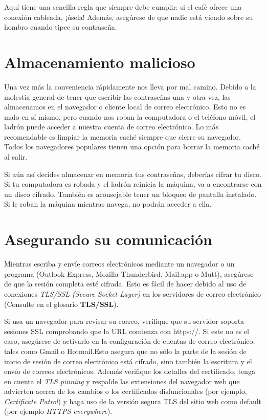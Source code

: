 \documentclass[10pt,a5paper,twoside,,]{book}
\begin{document}
Aquí tiene una sencilla regla que siempre debe cumplir: si el café
ofrece una conexión cableada, ¡úsela! Además, asegúrese de que nadie
está viendo sobre su hombro cuando tipee su contraseña.

\section{Almacenamiento malicioso}\label{almacenamiento-malicioso}

Una vez más la conveniencia rápidamente nos lleva por mal camino. Debido
a la molestia general de tener que escribir las contraseñas una y otra
vez, las almacenamos en el navegador o cliente local de correo
electrónico. Esto no es malo en sí mismo, pero cuando nos roban la
computadora o el teléfono móvil, el ladrón puede acceder a nuestra
cuenta de correo electrónico. Lo más recomendable es limpiar la memoria
caché siempre que cierre su navegador. Todos los navegadores populares
tienen una opción para borrar la memoria caché al salir.

Si aún así decides almacenar en memoria tus contraseñas, deberías cifrar
tu disco. Si tu computadora es robada y el ladrón reinicia la máquina,
va a encontrarse con un disco cifrado. También es aconsejable tener un
bloqueo de pantalla instalado. Si le roban la máquina mientras navega,
no podrán acceder a ella.

\section{Asegurando su
comunicación}\label{asegurando-su-comunicaciuxf3n}

Mientras escriba y envíe correos electrónicos mediante un navegador o un
programa (Outlook Express, Mozilla Thunderbird, Mail.app o Mutt),
asegúrese de que la sesión completa esté cifrada. Esto es fácil de hacer
debido al uso de conexiones \emph{TLS/SSL (Secure Socket Layer)} en los
servidores de correo electrónico (Consulte en el glosario
\textbf{TLS/SSL}).

Si usa un navegador para revisar su correo, verifique que su servidor
soporta sesiones SSL comprobando que la URL comienza con https://. Si
este no es el caso, asegúrese de activarlo en la configuración de
cuentas de correo electrónico, tales como Gmail o Hotmail.Esto asegura
que no sólo la parte de la sesión de inicio de sesión de correo
electrónico está cifrado, sino también la escritura y el envío de
correos electrónicos. Además verifique los detalles del certificado,
tenga en cuenta el \emph{TLS pinning} y respalde las extensiones del
navegador web que advierten acerca de los cambios o los certificados
disfuncionales (por ejemplo, \emph{Certificate Patrol}) y haga uso de la
versión segura TLS del sitio web como default (por ejemplo \emph{HTTPS
everywhere}).
\end{document}
